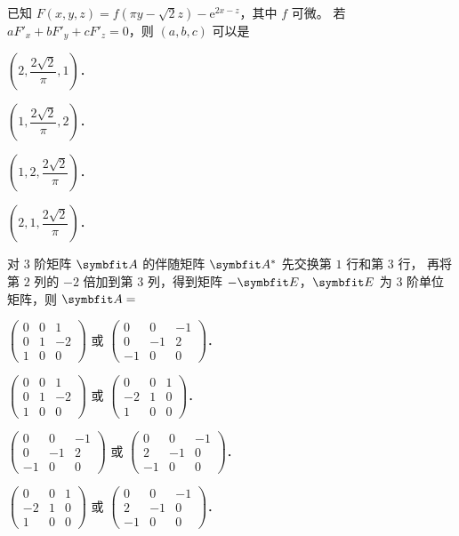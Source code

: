 \begin{question}[index=4]
已知 $F(x,y,z)=f(\pi y-\sqrt2z)-\mathrm e^{2x-z}$，其中 $f$ 可微。
若 $aF'_x+bF'_y+cF'_z=0$，则 $(a,b,c)$ 可以是
\begin{choices}[columns=2,label-pos=left]
\item $\left(2,\dfrac{2\sqrt2}{\pi},1\right)$．
\item $\left(1,\dfrac{2\sqrt2}{\pi},2\right)$．
\item $\left(1,2,\dfrac{2\sqrt2}{\pi}\right)$．
\item $\left(2,1,\dfrac{2\sqrt2}{\pi}\right)$．
\end{choices}
\end{question}
\QuestionBreak

\begin{question}[index=5]
对 $3$ 阶矩阵 $\symbfit A$ 的伴随矩阵 $\symbfit A^*$ 先交换第 $1$ 行和第 $3$ 行，
再将第 $2$ 列的 $-2$ 倍加到第 $3$ 列，得到矩阵 $-\symbfit E$，$\symbfit E$ 为 $3$ 阶单位矩阵，则 $\symbfit A=$
\begin{choices}[columns=2,label-pos=left]
\item $\begin{pmatrix}0&0&1\\0&1&-2\\1&0&0\end{pmatrix}$ 或 $\begin{pmatrix}0&0&-1\\0&-1&2\\-1&0&0\end{pmatrix}$．
\item $\begin{pmatrix}0&0&1\\0&1&-2\\1&0&0\end{pmatrix}$ 或 $\begin{pmatrix}0&0&1\\-2&1&0\\1&0&0\end{pmatrix}$．
\item $\begin{pmatrix}0&0&-1\\0&-1&2\\-1&0&0\end{pmatrix}$ 或 $\begin{pmatrix}0&0&-1\\2&-1&0\\-1&0&0\end{pmatrix}$．
\item $\begin{pmatrix}0&0&1\\-2&1&0\\1&0&0\end{pmatrix}$ 或 $\begin{pmatrix}0&0&-1\\2&-1&0\\-1&0&0\end{pmatrix}$．
\end{choices}
\end{question}
\QuestionBreak

